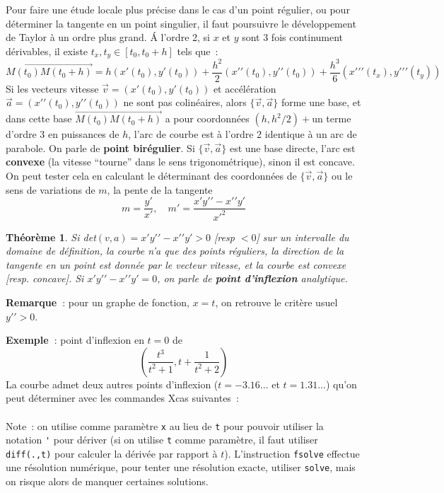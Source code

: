 \documentclass[a4paper,11pt]{book}
\newtheorem{thm}{Théorème}
\begin{document}
\begin{giacjshere}
Pour faire une \'etude locale plus pr\'ecise dans le cas d'un point
r\'egulier, ou pour d\'eterminer la tangente en un point singulier,
il faut poursuivre le d\'eveloppement de Taylor \`a un ordre plus
grand. \'A l'ordre 2, si $x$ et $y$ sont 3 fois continument
d\'erivables, il existe $t_x,t_y\in [t_0,t_0+h]$ tels que~:
$$\overrightarrow{M(t_0)M(t_0+h)}= 
h (x'(t_0),y'(t_0))+\frac{h^2}{2}(x'{'}(t_0),y'{'}(t_0))
+\frac{h^3}{6}(x'{'}'(t_x),y'{'}'(t_y))
$$
Si les vecteurs vitesse $\overrightarrow{v}=(x'(t_0),y'(t_0))$
et acc\'el\'eration $\overrightarrow{a}=(x'{'}(t_0),y'{'}(t_0))$
ne sont pas colin\'eaires, 
alors $\{\overrightarrow{v},\overrightarrow{a}\}$ forme 
une base, et dans cette base $\overrightarrow{M(t_0)M(t_0+h)}$
a pour coordonn\'ees $(h,h^2/2)+$un terme d'ordre 3 en puissances de $h$, l'arc
de courbe est \`a l'ordre 2 identique \`a un arc de parabole. 
On parle de {\bf point bir\'egulier}.
Si $\{\overrightarrow{v},\overrightarrow{a}\}$ est une base directe,
l'arc est {\bf convexe} (la vitesse
``tourne'' dans le sens trigonom\'etrique),
sinon il est concave. On peut tester cela en calculant
le d\'eterminant des coordonn\'ees de 
$\{\overrightarrow{v},\overrightarrow{a}\}$ ou le sens
de variations de $m$, la pente de la tangente 
\[ m=\frac{y'}{x'}, \quad m'=\frac{x'y'{'}-x'{'}y'}{x'^2} \]

\begin{thm}
Si det$(v,a)=x'y'{'}-x'{'}y'>0$ [resp $<0$] 
sur un intervalle du domaine de d\'efinition,
la courbe n'a que des points r\'eguliers, 
la direction de la tangente en un point
est donn\'ee par le vecteur vitesse, et la courbe est convexe
[resp. concave].
Si $x'y'{'}-x'{'}y'=0$, on parle de 
{\bf point d'inflexion} analytique.
\end{thm}
{\bf Remarque~}: pour un graphe de fonction, $x=t$, on retrouve le
crit\`ere usuel $y'{'}>0$.

{\bf Exemple~}: point d'inflexion en $t=0$ de
$$ (\frac{t^3}{t^2+1},t+\frac{1}{t^2+2}) $$
La courbe admet deux autres points d'inflexion ($t=-3.16...$ et
$t=1.31...$) qu'on peut d\'eterminer avec les commandes Xcas suivantes~:\\
\\
\ifhevea
{}
\fi
Note~: on utilise comme param\`etre \verb|x| au lieu de \verb|t| pour pouvoir 
utiliser la notation \verb|'| pour d\'eriver (si on utilise \verb|t|
comme param\`etre, il faut utiliser \verb|diff(.,t)| pour calculer
la d\'eriv\'ee par rapport \`a $t$). L'instruction \verb|fsolve|
effectue une r\'esolution num\'erique, pour tenter une r\'esolution
exacte, utiliser \verb|solve|, mais on risque alors de manquer
certaines solutions.


\end{giacjshere}
\end{document}
